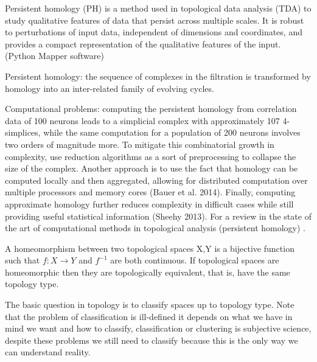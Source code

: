 \documentclass[onecollarge,runningheads]{svjour2}
\begin{document}
Persistent homology (PH) is a method used in topological data analysis (TDA) to study qualitative features of data that persist across multiple scales. It is robust to perturbations of input data, independent of dimensions and coordinates, and provides a compact representation of the qualitative features of the input. (Python Mapper software) 

Persistent homology:  the sequence of complexes in the filtration is transformed by homology into an inter-related family of evolving cycles.

Computational problems: computing the persistent homology from correlation data of 100 neurons leads to a simplicial complex with approximately 107 4-simplices, while the same computation for a population of 200 neurons involves two orders of magnitude more.
To mitigate this combinatorial growth in complexity, use reduction algorithms as a sort of preprocessing to collapse the size of the complex.
Another approach is to use the fact that homology can be computed locally and then aggregated, allowing for distributed computation over multiple processors and memory cores (Bauer et al. 2014). Finally, computing approximate homology further reduces complexity in difficult cases while still providing useful statistical information (Sheehy 2013). 
For a review in the state of the art of computational methods in topological analysis (persistent homology) \cite{otter2015roadmap}.




A homeomorphism between two topological spaces X,Y is a bijective function such that $f:X \to Y$ and $f^{-1}$ are both continuous. If topological spaces are homeomorphic then they are topologically equivalent, that is, have the same topology type.

The basic question in topology is to classify spaces up to topology type. 
Note that the problem of classification is ill-defined it depends on what we have in mind we want and how to classify, classification or clustering is subjective science, despite these problems we still need to classify because this is the only way we can understand reality. %
\end{document}
